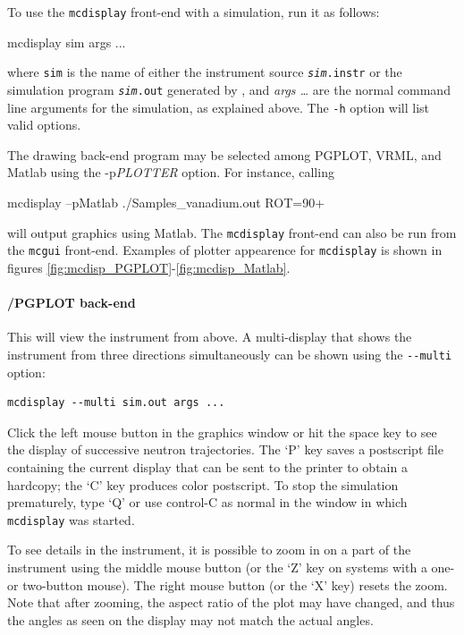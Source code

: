 To use the \verb+mcdisplay+ front-end with a simulation, run it as
follows:
\begin{bash}
mcdisplay sim args ...
\end{bash}

where \verb+sim+ is the name of either the instrument source
\texttt{\textit{sim}.instr} or the simulation program \texttt{\textit{sim}.out} generated by \mcs,
and \textit{args \ldots} are the normal command line arguments for the
simulation, as explained above. The \verb+-h+ option will list valid options.

The drawing back-end program may be selected among
PGPLOT, VRML, and Matlab using the -p\textit{PLOTTER} option. For instance, calling
\begin{bash}
mcdisplay --pMatlab ./Samples_vanadium.out ROT=90+
\end{bash}
will output graphics using Matlab.
The \verb+mcdisplay+ front-end can also be run from the \verb+mcgui+ front-end.
Examples of plotter appearence for \verb+mcdisplay+ is shown in figures
 \ref{fig:mcdisp_PGPLOT}-\ref{fig:mcdisp_Matlab}.

\paragraph{\MCS /PGPLOT back-end}

This will view the instrument from above. A multi-display that shows the
instrument from three directions simultaneously can be shown using the
\verb+--multi+ option:
\begin{lstlisting}
mcdisplay --multi sim.out args ...
\end{lstlisting}

Click the left mouse button in the graphics window or hit the space key to see
the display of successive neutron trajectories. The `P' key saves a postscript
file containing the current display that can be sent to the printer to obtain a
hardcopy; the `C' key produces color postscript.  To stop the simulation
prematurely, type `Q' or use control-C as normal in the window in which
\verb+mcdisplay+ was started.

To see details in the instrument, it is possible to zoom in on a part of the
instrument using the middle mouse button (or the `Z' key on systems with a one-
or two-button mouse). The right mouse button (or the `X' key) resets the
zoom. Note that after zooming, the aspect ratio of the plot may have changed,
and thus the angles as seen on the display may not match the actual angles.


